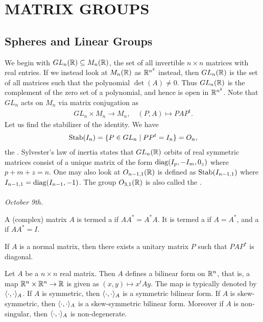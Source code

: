 \chapter{MATRIX GROUPS}

\section{Spheres and Linear Groups}

We begin with $GL_{n}(\mathbb{R}) \subseteq M_{n}(\mathbb{R})$, the set of all invertible $n \times n$ matrices with real entries. If we instead look at $M_{n}(\mathbb{R})$ as $\mathbb{R}^{n^{2}}$ instead, then $GL_{n}(\mathbb{R})$ is the set of all matrices such that the polynomial $\det(A) \neq 0$. Thus $GL_{n}(\mathbb{R})$ is the complement of the zero set of a polynomial, and hence is open in $\mathbb{R}^{n^{2}}$. Note that $GL_{n}$ acts on $M_{n}$ via matrix conjugation as
\begin{align}
    GL_{n} \times M_{n} \to M_{n}, \quad (P,A) \mapsto PAP^{t}.
\end{align}
Let us find the stabilizer of the identity. We have
\begin{align}
    \operatorname{Stab} (I_{n}) = \{P \in GL_{n} \mid PP^{t} = I_{n}\} = O_{n},
\end{align}
the . Sylvester's law of inertia states that $GL_{n}(\mathbb{R})$ orbits of real symmetric matrices consist of a unique matrix of the form $\operatorname{diag}(I_{p},-I_{m},0_{z})$ where $p+m+z = n$. One may also look at $O_{n-1,1}(\mathbb{R})$ is defined as $\operatorname{Stab} (I_{n-1,1})$ where $I_{n-1,1} = \operatorname{diag}(I_{n-1},-1)$. The group $O_{3,1}(\mathbb{R})$ is also called the .\\ \\
\textit{October 9th.}

\begin{definition}
    A (complex) matrix $A$ is termed a  if $AA^{\ast} = A^{\ast}A$. It is termed a  if $A = A^{\ast}$, and a  if $AA^{\ast} = I$.
\end{definition}

\begin{theorem}
    If $A$ is a normal matrix, then there exists a unitary matrix $P$ such that $PAP^{\ast}$ is diagonal.
\end{theorem}

Let $A$ be a $n \times n$ real matrix. Then $A$ defines a bilinear form on $\mathbb{R}^{n}$, that is, a map $\mathbb{R}^{n} \times \mathbb{R}^{n} \to \mathbb{R}$ is given as $(x,y) \mapsto x^{t}Ay$. The map is typically denoted by $\langle\cdot,\cdot\rangle_{A}$. If $A$ is symmetric, then $\langle\cdot,\cdot\rangle_{A}$ is a symmetric bilinear form. If $A$ is skew-symmetric, then $\langle\cdot,\cdot\rangle_{A}$ is a skew-symmetric bilinear form. Moreover if $A$ is non-singular, then $\langle\cdot,\cdot\rangle_{A}$ is non-degenerate. 

